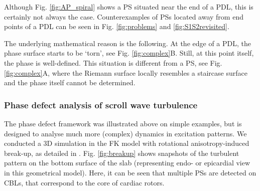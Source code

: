 \documentclass[aps,pre,amsfonts,amssymb,amsmath,twocolumn, superscriptaddress]{revtex4-1}
\begin{document}
Although Fig. \ref{fig:AP_spiral} shows a PS situated near the end of a PDL, this is certainly not always the case. Counterexamples of PSs located away from end points of a PDL can be seen in Fig. \ref{fig:problems} and \ref{fig:S1S2revisited}. 

The underlying mathematical reason is the following. At the edge of a PDL, the phase surface starts to be `torn', see Fig. \ref{fig:complex}B. Still, at this point itself, the phase is well-defined. This situation is different from a PS, see Fig. \ref{fig:complex}A, where the Riemann surface locally resembles a staircase surface and the phase itself cannot be determined.  

\subsubsection{Phase defect analysis of scroll wave turbulence}

The phase defect framework was illustrated above on simple examples, but is designed to analyse much more (complex) dynamics in excitation patterns. We conducted a 3D simulation in the FK model with rotational anisotropy-induced break-up, as detailed in \citep{Fenton:1998}. Fig. \ref{fig:breakup} shows snapshots of the turbulent pattern on the bottom surface of the slab (representing endo- or epicardial view in this geometrical model). Here, it can be seen that multiple PSs are detected on CBLs, that correspond to the core of cardiac rotors. 
\end{document}
